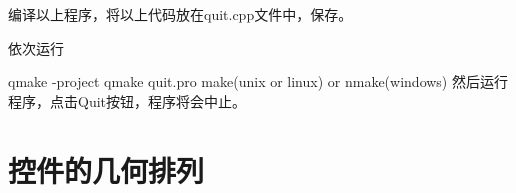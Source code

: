 \documentclass[11pt,oneside]{book}
\begin{document}
\begin{common-format}
编译以上程序，将以上代码放在quit.cpp文件中，保存。

依次运行

qmake -project
qmake quit.pro
make(unix or linux) or nmake(windows)
然后运行程序，点击Quit按钮，程序将会中止。 


\section{控件的几何排列}


%
%

\end{common-format}
\end{document}
